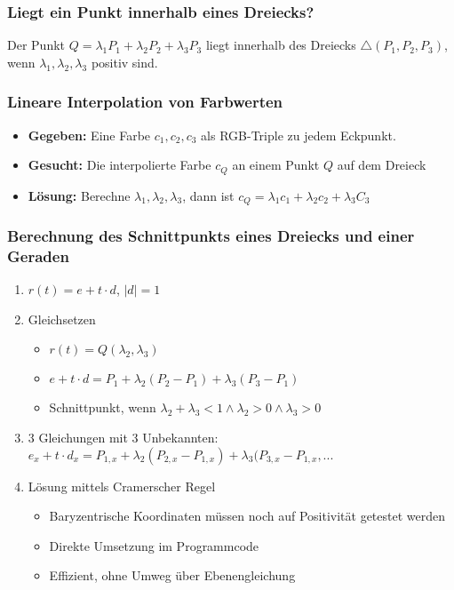 \subsubsection{Liegt ein Punkt innerhalb eines Dreiecks?}
Der Punkt \(Q = \lambda_1 P_1 + \lambda_2 P_2 + \lambda_3 P_3\) liegt innerhalb des Dreiecks \(\triangle(P_1,P_2,P_3)\), wenn \(\lambda_1,\lambda_2,\lambda_3\) positiv sind.

\subsubsection{Lineare Interpolation von Farbwerten}
\begin{itemize}
	\item \textbf{Gegeben:} Eine Farbe \(c_1,c_2,c_3\) als RGB-Triple zu jedem Eckpunkt.
	\item \textbf{Gesucht:} Die interpolierte Farbe \(c_Q\) an einem Punkt \(Q\) auf dem Dreieck
	\item \textbf{Lösung:} Berechne \(\lambda_1,\lambda_2,\lambda_3\), dann ist \(c_Q=\lambda_1 c_1+\lambda_2 c_2 + \lambda_3 C_3\)
\end{itemize}

\subsubsection{Berechnung des Schnittpunkts eines Dreiecks und einer Geraden}
\begin{enumerate}
	\item \(r(t) = e+t\cdot d\), \(|d|=1\)
	\item Gleichsetzen
	\begin{itemize}
		\item \(r(t) = Q(\lambda_2,\lambda_3)\)
		\item \(e+t\cdot d = P_1+\lambda_2(P_2-P_1)+\lambda_3(P_3-P_1)\)
		\item Schnittpunkt, wenn \(\lambda_2+\lambda_3<1 \wedge \lambda_2 > 0 \wedge \lambda_3 >0\)
	\end{itemize}
	\item 3 Gleichungen mit 3 Unbekannten: \(e_x+t\cdot d_x=P_{1,x}+\lambda_2(P_{2,x}-P_{1,x})+\lambda_3(P_{3,x}-P_{1,x},...\)
	\item Lösung mittels Cramerscher Regel
	\begin{itemize}
		\item Baryzentrische Koordinaten müssen noch auf Positivität getestet werden
		\item Direkte Umsetzung im Programmcode
		\item Effizient, ohne Umweg über Ebenengleichung
	\end{itemize}
\end{enumerate}
